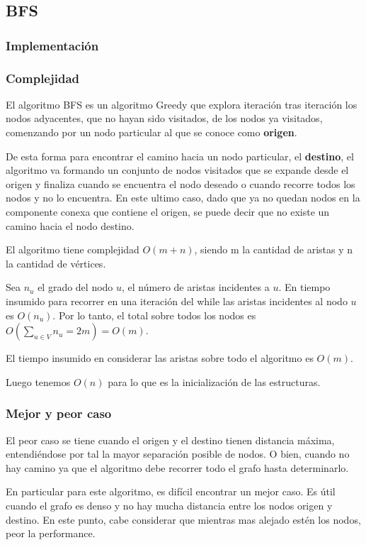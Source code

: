 \subsection{BFS}
\subsubsection{Implementación}



\subsubsection{Complejidad}
El algoritmo BFS es un algoritmo Greedy que explora iteración tras iteración los nodos adyacentes, que no hayan sido visitados, de los nodos ya visitados, comenzando por un nodo particular al que se conoce como \textbf{origen}. 

De esta forma para encontrar el camino hacia un nodo particular, el \textbf{destino}, el algoritmo va formando un conjunto de nodos visitados que se expande desde el origen y finaliza cuando se encuentra el nodo deseado o cuando recorre todos los nodos y no lo encuentra. En este ultimo caso, dado que ya no quedan nodos en la componente conexa que contiene el origen, se puede decir que no existe un camino hacia el nodo destino.

El algoritmo tiene complejidad $O(m + n)$, siendo m la cantidad de aristas y n la cantidad de vértices.

Sea $n_u$ el grado del nodo $u$, el número de aristas incidentes a $u$. En tiempo insumido para recorrer en una iteración del while las aristas incidentes al nodo $u$ es $O(n_u)$.
Por lo tanto, el total sobre todos los nodos es $O(\sum_{u\in V}{} n_u = 2m) = O(m)$.

El tiempo insumido en considerar las aristas sobre todo el algoritmo es $O(m)$.

Luego tenemos $O(n)$ para lo que es la inicialización de las estructuras.

\subsubsection{Mejor y peor caso}
El peor caso se tiene cuando el origen y el destino tienen distancia máxima, entendiéndose por tal la mayor separación posible de nodos. O bien, cuando no hay camino ya que el algoritmo debe recorrer todo el grafo hasta determinarlo.

En particular para este algoritmo, es difícil encontrar un mejor caso. Es útil cuando el grafo es denso y no hay mucha distancia entre los nodos origen y destino. En este punto, cabe considerar que mientras mas alejado estén los nodos, peor la performance.

